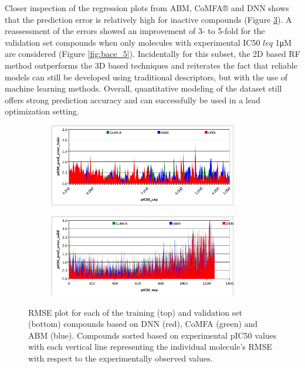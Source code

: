 Closer inspection of the regression plots from ABM, CoMFA® and DNN shows that the prediction error is relatively high for inactive compounds (Figure \ref{fig:bace_4}).  A reassessment of the errors showed an improvement of 3- to 5-fold for the validation set compounds when only molecules with experimental IC50 $leq$ 1μM are considered (Figure \ref{fig:bace_5}).  Incidentally for this subset, the 2D based RF method outperforms the 3D based techniques and reiterates the fact that reliable models can still be developed using traditional descriptors, but with the use of machine learning methods.  Overall, quantitative modeling of the dataset still offers strong prediction accuracy and can successfully be used in a lead optimization setting. 


\begin{figure}
\centering
\begin{subfigure}
  \centering
  \includegraphics[width=0.9\textwidth]{Images/fig_bace4A.png}
  \label{fig:bace_4A}
\end{subfigure}
\begin{subfigure}
  \centering
  \includegraphics[width=0.9\textwidth]{Images/fig_bace4B.png}
  \label{fig:bace_4B}
\end{subfigure}
\caption{RMSE plot for each of the training (top) and validation set (bottom) compounds based on DNN (red), CoMFA (green) and ABM (blue).  Compounds sorted based on experimental pIC50 values with each vertical line representing the individual molecule’s RMSE with respect to the experimentally observed values.}
\label{fig:bace_4}
\end{figure}

